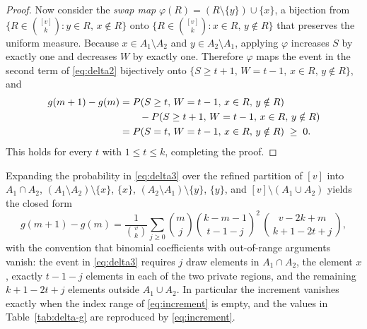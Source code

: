 \begin{proof}
  Now consider the \emph{swap map}
  $\varphi(R) = (R \setminus \{y\}) \cup \{x\}$, a bijection from
  $\{R \in \binom{[v]}{k} : y \in R,\, x \notin R\}$ onto
  $\{R \in \binom{[v]}{k}: x \in R,\, y \notin R\}$ that preserves the
  uniform measure.  Because $x \in A_1 \setminus A_2$ and
  $y \in A_2 \setminus A_1$, applying $\varphi$ increases $S$ by exactly
  one and decreases $W$ by exactly one.  Therefore $\varphi$ maps the event
  in the second term of \eqref{eq:delta2} bijectively onto
  $\{S \ge t+1,\, W = t-1,\, x \in R,\, y \notin R\}$, and
  \begin{align}
    g(m+1) - g(m)
    &= P(S \ge t,\, W = t-1,\, x \in R,\, y \notin R) \notag \\
    &\qquad - P(S \ge t+1,\, W = t-1,\, x \in R,\, y \notin R) \notag \\
    &= P(S = t,\, W = t-1,\, x \in R,\, y \notin R) \;\ge\; 0.
    \label{eq:delta3}
  \end{align}
  This holds for every $t$ with $1 \le t \le k$, completing the proof.
\end{proof}

\begin{corollary}
  \label{cor:increment}
  Expanding the probability in \eqref{eq:delta3} over the refined partition
  of $[v]$ into $A_1 \cap A_2$, $(A_1 \setminus A_2)\setminus\{x\}$,
  $\{x\}$, $(A_2 \setminus A_1)\setminus\{y\}$, $\{y\}$, and
  $[v] \setminus (A_1 \cup A_2)$ yields the closed form
  \begin{equation}
    \label{eq:increment}
    g(m+1) - g(m)
    = \frac{1}{\binom{v}{k}} \sum_{j \ge 0}
      \binom{m}{j} \binom{k-m-1}{\,t-1-j\,}^{\!2}\,
      \binom{v-2k+m}{\,k+1-2t+j\,},
  \end{equation}
  with the convention that binomial coefficients with out-of-range
  arguments vanish: the event in \eqref{eq:delta3} requires $j$ draw
  elements in $A_1 \cap A_2$, the element $x$, exactly $t-1-j$ elements in
  each of the two private regions, and the remaining $k+1-2t+j$ elements
  outside $A_1 \cup A_2$.  In particular the increment vanishes exactly
  when the index range of \eqref{eq:increment} is empty, and the values in
  Table~\ref{tab:delta-g} are reproduced by \eqref{eq:increment}.
\end{corollary}

